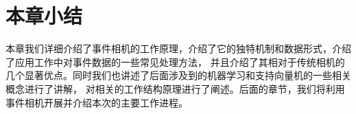 \section{本章小结}
本章我们详细介绍了事件相机的工作原理，介绍了它的独特机制和数据形式，介绍了应用工作中对事件数据的一些常见处理方法，
并且介绍了其相对于传统相机的几个显著优点。同时我们也讲述了后面涉及到的机器学习和支持向量机的一些相关概念进行了讲解，
对相关的工作结构原理进行了阐述。后面的章节，我们将利用事件相机开展并介绍本次的主要工作进程。